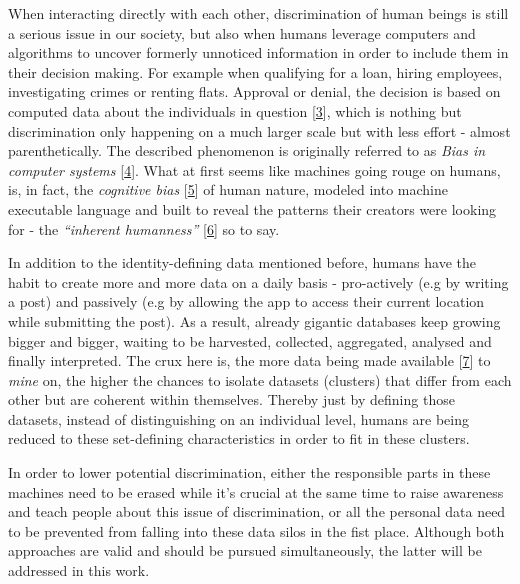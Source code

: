 \documentclass[12pt,english,a4paper,titlepage,cleardoublepage=empty,dottedtoc]{report}
\begin{document}
When interacting directly with each other, discrimination of human
beings is still a serious issue in our society, but also when humans
leverage computers and algorithms to uncover formerly unnoticed
information in order to include them in their decision making. For
example when qualifying for a loan, hiring employees, investigating
crimes or renting flats. Approval or denial, the decision is based on
computed data about the individuals in question
{[}\protect\hyperlink{ref-book_2015_ethical-it-innovation_ethical-uses-of-information-and-knowledge}{3}{]},
which is nothing but discrimination only happening on a much larger
scale but with less effort - almost parenthetically. The described
phenomenon is originally referred to as \emph{Bias in computer systems}
{[}\protect\hyperlink{ref-paper_1996_bias-in-computer-systems}{4}{]}.
What at first seems like machines going rouge on humans, is, in fact,
the \emph{cognitive bias}
{[}\protect\hyperlink{ref-wikipedia_2016_cognitive-bias}{5}{]} of human
nature, modeled into machine executable language and built to reveal the
patterns their creators were looking for - the \emph{``inherent
humanness''}
{[}\protect\hyperlink{ref-web_2016_big-data-is-people}{6}{]} so to say.

In addition to the identity-defining data mentioned before, humans have
the habit to create more and more data on a daily basis - pro-actively
(e.g by writing a post) and passively (e.g by allowing the app to access
their current location while submitting the post). As a result, already
gigantic databases keep growing bigger and bigger, waiting to be
harvested, collected, aggregated, analysed and finally interpreted. The
crux here is, the more data being made available
{[}\protect\hyperlink{ref-video_2015_big-data-and-deep-learning_discrimination}{7}{]}
to \emph{mine} on, the higher the chances to isolate datasets (clusters)
that differ from each other but are coherent within themselves. Thereby
just by defining those datasets, instead of distinguishing on an
individual level, humans are being reduced to these set-defining
characteristics in order to fit in these clusters.

In order to lower potential discrimination, either the responsible parts
in these machines need to be erased while it's crucial at the same time
to raise awareness and teach people about this issue of discrimination,
or all the personal data need to be prevented from falling into these
data silos in the fist place. Although both approaches are valid and
should be pursued simultaneously, the latter will be addressed in this
work.
\end{document}
